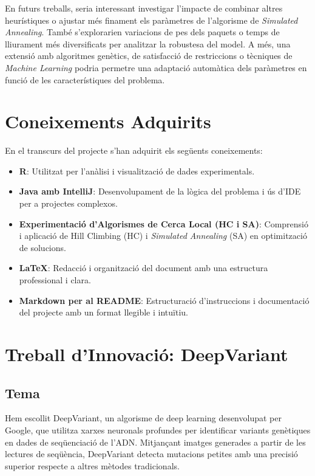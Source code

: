 \documentclass[a4paper]{article}
\begin{document}
	En futurs treballs, seria interessant investigar l'impacte de combinar altres heurístiques o ajustar més finament els paràmetres de l'algorisme de \textit{Simulated Annealing}. També s'explorarien variacions de pes dels paquets o temps de lliurament més diversificats per analitzar la robustesa del model. A més, una extensió amb algoritmes genètics, de satisfacció de restriccions o tècniques de \textit{Machine Learning} podria permetre una adaptació automàtica dels paràmetres en funció de les característiques del problema.
	
	\section{Coneixements Adquirits}
	En el transcurs del projecte s'han adquirit els següents coneixements:
	
	\begin{itemize}
		\item \textbf{R}: Utilitzat per l'anàlisi i visualització de dades experimentals.
		\item \textbf{Java amb IntelliJ}: Desenvolupament de la lògica del problema i ús d'IDE per a projectes complexos.
		\item \textbf{Experimentació d'Algorismes de Cerca Local (HC i SA)}: Comprensió i aplicació de Hill Climbing (HC) i \textit{Simulated Annealing} (SA) en optimització de solucions.
		\item \textbf{\LaTeX}: Redacció i organització del document amb una estructura professional i clara.
		\item \textbf{Markdown per al README}: Estructuració d'instruccions i documentació del projecte amb un format llegible i intuïtiu.
	\end{itemize}
	
	
	
	\newpage
	\section{Treball d'Innovació: DeepVariant}
	
	\subsection{Tema}
	Hem escollit DeepVariant, un algorisme de deep learning desenvolupat per Google, que utilitza xarxes neuronals profundes per identificar variants genètiques en dades de seqüenciació de l'ADN. Mitjançant imatges generades a partir de les lectures de seqüència, DeepVariant detecta mutacions petites amb una precisió superior respecte a altres mètodes tradicionals.
	
\end{document}
